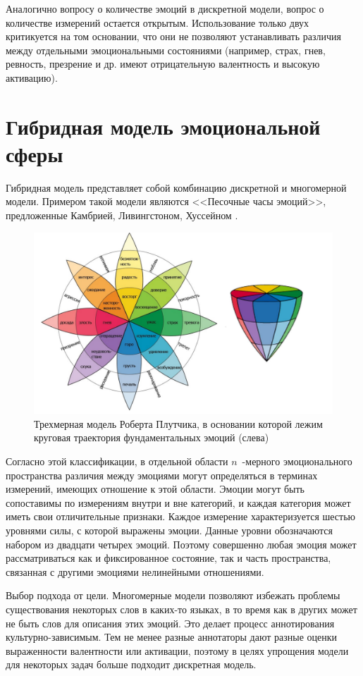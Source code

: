 Аналогично вопросу о количестве эмоций в дискретной модели, вопрос о количестве измерений остается открытым. Использование только двух критикуется на том основании, что они не позволяют устанавливать различия между отдельными эмоциональными состояниями (например, страх, гнев, ревность, презрение и др. имеют отрицательную валентность и высокую активацию).

\section{Гибридная модель эмоциональной сферы}
Гибридная модель представляет собой комбинацию дискретной и многомерной модели. Примером такой модели являются <<Песочные часы эмоций>>, предложенные Камбрией, Ливингстоном, Хуссейном \cite{hourglass}. 
\begin{figure}[H]
	\centering
	\includegraphics[width=0.8\linewidth]{assets/hourglass.pdf}
	\caption{Трехмерная модель Роберта Плутчика, в основании которой лежим круговая траектория фундаментальных эмоций (слева)}
	\label{fig:hourglass}
\end{figure}

Согласно этой классификации, в отдельной области $n$~-мерного эмоционального пространства различия между эмоциями могут определяться в терминах измерений, имеющих отношение к этой области. Эмоции могут быть сопоставимы по измерениям внутри и вне категорий, и каждая категория может иметь свои отличительные признаки. \cite{Russell2003} Каждое измерение характеризуется шестью уровнями силы, с которой выражены эмоции. Данные уровни обозначаются набором из двадцати четырех эмоций. Поэтому совершенно любая эмоция может рассматриваться как и фиксированное состояние, так и часть пространства, связанная с другими эмоциями нелинейными отношениями. 

Выбор подхода от цели. Многомерные модели позволяют избежать проблемы существования  некоторых слов в каких-то языках, в то время как в других может не быть слов для описания этих эмоций. Это делает процесс аннотирования культурно-зависимым. Тем не менее разные аннотаторы дают разные оценки выраженности валентности или активации, поэтому в целях упрощения модели для некоторых задач больше подходит дискретная модель.

